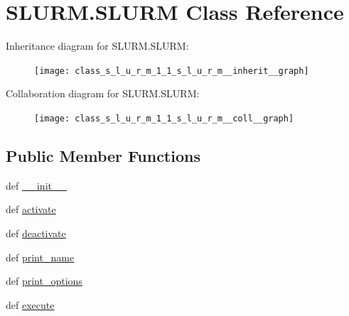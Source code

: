 \hypertarget{class_s_l_u_r_m_1_1_s_l_u_r_m}{\section{S\-L\-U\-R\-M.\-S\-L\-U\-R\-M Class Reference}
\label{class_s_l_u_r_m_1_1_s_l_u_r_m}
}


Inheritance diagram for S\-L\-U\-R\-M.\-S\-L\-U\-R\-M\-:
\nopagebreak
\begin{figure}[H]
\begin{center}
\leavevmode
\texttt{[image: class\_s\_l\_u\_r\_m\_1\_1\_s\_l\_u\_r\_m\_\_inherit\_\_graph]}
\end{center}
\end{figure}


Collaboration diagram for S\-L\-U\-R\-M.\-S\-L\-U\-R\-M\-:
\nopagebreak
\begin{figure}[H]
\begin{center}
\leavevmode
\texttt{[image: class\_s\_l\_u\_r\_m\_1\_1\_s\_l\_u\_r\_m\_\_coll\_\_graph]}
\end{center}
\end{figure}
\subsection*{Public Member Functions}
\begin{DoxyCompactItemize}
\item 
def \hyperlink{class_s_l_u_r_m_1_1_s_l_u_r_m_aa985bacce290322ef03060d671e705a1}{\-\_\-\-\_\-init\-\_\-\-\_\-}
\item 
def \hyperlink{class_s_l_u_r_m_1_1_s_l_u_r_m_a7b3b5d04275a853d623f6fff36b76e7e}{activate}
\item 
def \hyperlink{class_s_l_u_r_m_1_1_s_l_u_r_m_a4622d35bba26ef97a305e9d057e5db6c}{deactivate}
\item 
def \hyperlink{class_s_l_u_r_m_1_1_s_l_u_r_m_a79a9d29418a1a20a9d502c0723c3e8e7}{print\-\_\-name}
\item 
def \hyperlink{class_s_l_u_r_m_1_1_s_l_u_r_m_ad735f2669f29aca338d4dc61b6423284}{print\-\_\-options}
\item 
def \hyperlink{class_s_l_u_r_m_1_1_s_l_u_r_m_ab53b5b6093e23284f0f8494fc2be2263}{execute}
\end{DoxyCompactItemize}
